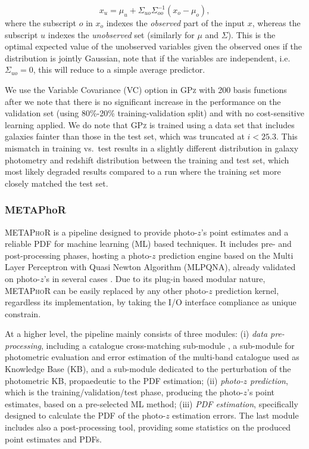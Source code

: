 \documentclass[usenatbib]{mn2e}
\begin{document}
\begin{equation}
x_{u} = \mu_{u}+\Sigma_{uo}\Sigma_{oo}^{-1}(x_{o}-\mu_{o}),
\end{equation}  %
where the subscript $o$ in $x_{o}$ indexes the \emph{observed} part of the input $x$, whereas the subscript $u$ indexes the \emph{unobserved} set (similarly for $\mu$ and $\Sigma$). This is the optimal expected value of the unobserved variables given the observed ones if the distribution is jointly Gaussian, note that if the variables are independent, i.e. $\Sigma_{uo}=0$, this will reduce to a simple average predictor.

We use the Variable Covariance (VC) option in \textsc{GPz} with 200 basis functions after we note that there is no significant increase in the performance on the validation set (using 80\%-20\% training-validation split) and with no cost-sensitive learning applied.  We do note that \textsc{GPz} is trained using a data set that includes galaxies fainter than those in the test set, which was truncated at $i<25.3$.  This mismatch in training vs.~test results in a slightly different distribution in galaxy photometry and redshift distribution between the training and test set, which most likely degraded results compared to a run where the training set more closely matched the test set.

\subsubsection{METAPhoR}
\label{sec:metaphor}
\textsc{METAPhoR} \citep[Machine-learning Estimation Tool for Accurate Photometric Redshifts,][]{Cavuoti:17} is a pipeline designed to provide photo-$z$'s point estimates and a reliable PDF for machine learning (ML) based techniques. It includes pre- and post-processing phases, hosting a photo-$z$ prediction engine based on the Multi Layer Perceptron with Quasi Newton Algorithm (MLPQNA), already validated on photo-$z$'s in several cases \citep{de_Jong:17,Cavuoti:17b,Cavuoti:15,Brescia:14,Brescia:13,Biviano:13}. Due to its plug-in based modular nature, \textsc{METAPhoR} can be easily replaced by any other photo-$z$ prediction kernel, regardless its implementation, by taking the I/O interface compliance as unique constrain.

At a higher level, the pipeline mainly consists of three modules: (i) \textit{data pre-processing}, including a catalogue cross-matching sub-module \citep[based on the tool C3, ][]{Riccio:17}, a sub-module for photometric evaluation and error estimation of the multi-band catalogue used as Knowledge Base (KB), and a sub-module dedicated to the perturbation of the photometric KB, propaedeutic to the PDF estimation; (ii) \textit{photo-$z$ prediction}, which is the training/validation/test phase, producing the photo-$z$'s point estimates, based on a pre-selected ML method; (iii) \textit{PDF estimation}, specifically designed to calculate the PDF of the photo-$z$ estimation errors. The last module includes also a post-processing tool, providing some statistics on the produced point estimates and PDFs.
\end{document}
